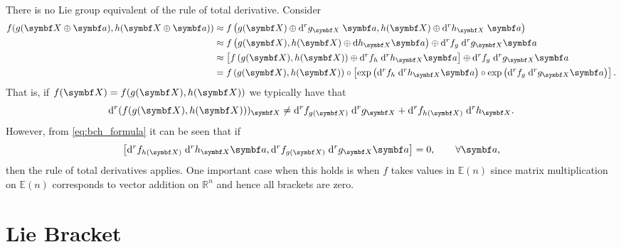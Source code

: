 \begin{remark}
  \label{remark:total_derivative}
  There is no Lie group equivalent of the rule of total derivative. Consider
  \begin{equation}
    \begin{aligned}
      f(g(\X \oplus \a), h(\X \oplus \a))
       & \approx f \left( g(\X) \oplus \mathrm{d}^r g_\X \; \a , h(\X) \oplus \mathrm{d}^r h_\X \; \a \right)                                                                                      \\
       & \approx f \left( g(\X) , h(\X) \oplus \mathrm{d} h_\X \a \right) \oplus \mathrm{d}^r f_{g} \; \mathrm{d}^r g_\X \a                                                                        \\
       & \approx \left[ f \left( g(\X) , h(\X) \right) \oplus \mathrm{d}^r f_h \; \mathrm{d}^r h_\X \a \right] \oplus \mathrm{d}^r f_{g} \; \mathrm{d}^r g_\X \a                                   \\
       & =  f \left( g(\X) , h(\X) \right) \circ \left[ \exp\left( \mathrm{d}^r f_h \; \mathrm{d}^r h_\X \a  \right) \circ \exp\left ( \mathrm{d}^r f_{g} \; \mathrm{d}^r g_\X \a \right) \right].
    \end{aligned}
  \end{equation}
  That is, if $f(\X) = f(g(\X), h(\X))$ we typically have that
  \begin{equation}
    \mathrm{d}^r (f(g(\X), h(\X)))_\X  \neq  \mathrm{d}^r f_{g(\X)} \; \mathrm {d}^r g_\X + \mathrm{d}^r f_{h(\X)} \; \mathrm {d}^r h_\X.
  \end{equation}
  However, from \eqref{eq:bch_formula} it can be seen that if
  \begin{equation}
    \left[ \mathrm{d}^r f_{h(\X)} \; \mathrm{d}^r h_\X \a  ,   \mathrm{d}^r f_{g(\X)} \; \mathrm{d}^r g_\X \a  \right] = 0, \qquad \forall \a,
  \end{equation}
  then the rule of total derivatives applies. One important case when this holds is when $f$ takes values in $\mathbb{E}(n)$ since matrix multiplication on $\mathbb{E}(n)$ corresponds to vector addition on $\mathbb{R}^n$ and hence all brackets are zero.
\end{remark}



\section{Lie Bracket}

